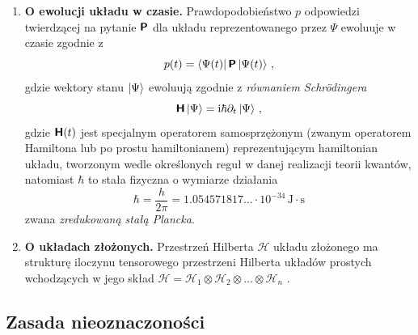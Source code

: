 \documentclass{myclass}
\begin{document}
\begin{enumerate}[label=\Roman*.]
    \item \textbf{O ewolucji układu w czasie.} Prawdopodobieństwo \(p\) odpowiedzi twierdzącej na
    pytanie \(\boldsymbol{\mathsf{P}}\) dla układu reprezentowanego przez \(\Psi\) ewoluuje w czasie zgodnie z
    \begin{equation*}
        p(t) = \bra{\Psi(t)}\boldsymbol{\mathsf{P}}\ket{\Psi(t)}\,,
    \end{equation*}
    gdzie wektory stanu \(\ket{\Psi}\) ewoluują zgodnie z \textit{równaniem Schr\"{o}dingera}
    \begin{equation*}
        \boldsymbol{\mathsf{H}}\ket{\Psi} = \mathrm{i}\hbar\partial_t\ket{\Psi}\,,
    \end{equation*}
    gdzie \(\boldsymbol{\mathsf{H}}(t)\) jest specjalnym operatorem samosprzężonym (zwanym operatorem Hamiltona lub
    po prostu hamiltonianem) reprezentującym hamiltonian układu, tworzonym wedle określonych reguł w
    danej realizacji teorii kwantów, natomiast \(\hbar\) to stała fizyczna o wymiarze działania
    \begin{equation*}
        \hbar = \frac{h}{2\pi} = 1.054571817\ldots \cdot 10^{-34}\,\text{J}\cdot\text{s}
    \end{equation*}
    zwana \textit{zredukowaną stałą Plancka}.
    
    \item \textbf{O układach złożonych.} Przestrzeń Hilberta \(\mathscr{H}\) układu złożonego ma
    strukturę iloczynu tensorowego przestrzeni Hilberta układów prostych wchodzących w jego skład
    \(\mathscr{H}=\mathscr{H}_1\otimes\mathscr{H}_2\otimes\ldots\otimes\mathscr{H}_n\) .

\end{enumerate}

\subsection{Zasada nieoznaczoności}
\end{document}
